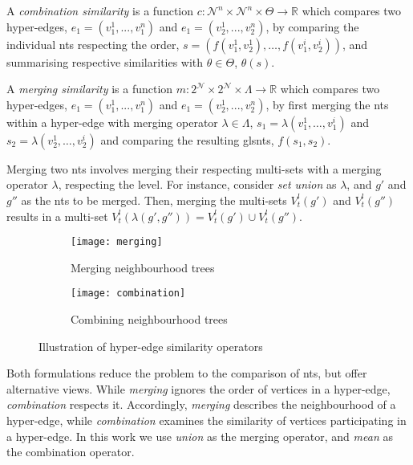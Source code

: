 \begin{definition}
A \textit{combination similarity} is a function $c: \mathcal{N}^n \times \mathcal{N}^n \times \Theta \rightarrow \mathbb{R}$ which compares two hyper-edges, $e_1 = (v_1^1,..., v_1^n)$ and $e_1 = (v_2^1,..., v_2^n)$, by comparing the individual \gls{nt}s respecting the order, $s = \left(f(v_1^1,v_2^1),\ldots,f(v_1^i,v_2^i) \right)$, and summarising respective similarities with $\theta \in \Theta$,  $\theta(s)$.
\end{definition}

\begin{definition}
A \textit{merging similarity} is a function $m: 2^{\mathcal{N}} \times 2^{\mathcal{N}} \times \Lambda \rightarrow \mathbb{R}$ which compares two hyper-edges, $e_1 = (v_1^1,..., v_1^n)$ and $e_1 = (v_2^1,..., v_2^n)$, by first merging the \gls{nt}s within a hyper-edge with merging operator $\lambda \in \Lambda$, $s_1 = \lambda (v_1^1,\ldots,v_1^i)$ and $s_2 = \lambda (v_2^1,\ldots,v_2^i)$ and comparing the resulting gls{nt}s, $f(s_1,s_2)$.
\end{definition}


Merging two \gls{nt}s involves merging their respecting multi-sets with a merging operator $\lambda$, respecting the level.
For instance, consider \textit{set union} as $\lambda$, and $g'$ and $g''$ as the \gls{nt}s to be merged.
Then, merging the multi-sets $V^l_{t}(g')$ and $V^l_{t}(g'')$ results in a multi-set $V^l_{t}\left(\lambda(g',g'')\right) = V^l_{t}(g') \cup V^l_{t}(g'')$.


\begin{figure}
	\centering
	\begin{subfigure}{\linewidth}
		\centering
		\texttt{[image: merging]}
		\caption{Merging neighbourhood trees\label{fig:ntmerging}}
	\end{subfigure}

	\begin{subfigure}{\linewidth}
		\centering
		\texttt{[image: combination]}
		\caption{Combining neighbourhood trees\label{fig:ntcombination}}
	\end{subfigure}
	\caption{Illustration of hyper-edge similarity operators}
\end{figure}


Both formulations reduce the problem to the comparison of \gls{nt}s, but offer alternative views.
While \textit{merging} ignores the order of vertices in a hyper-edge, \textit{combination} respects it.
Accordingly, \textit{merging} describes the neighbourhood of a hyper-edge, while \textit{combination} examines the similarity of vertices participating in a hyper-edge.
In this work we use \textit{union} as the merging operator, and \textit{mean} as the combination operator.



